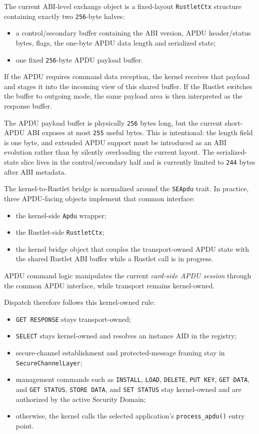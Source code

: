 The current ABI-level exchange object is a fixed-layout
\texttt{RustletCtx} structure containing exactly two \texttt{256}-byte halves:
\begin{itemize}
\item a control/secondary buffer containing the ABI version, APDU
  header/status bytes, flags, the one-byte APDU data length and serialized
  state;
\item one fixed \texttt{256}-byte APDU payload buffer.
\end{itemize}

If the APDU requires command data reception, the kernel receives that
payload and stages it into the incoming view of this shared buffer. If
the Rustlet switches the buffer to outgoing mode, the same payload area
is then interpreted as the response buffer.

The APDU payload buffer is physically \texttt{256} bytes long, but the current
short-APDU ABI exposes at most \texttt{255} useful bytes. This is intentional:
the length field is one byte, and extended APDU support must be introduced as
an ABI evolution rather than by silently overloading the current layout. The
serialized-state slice lives in the control/secondary half and is currently
limited to \texttt{244} bytes after ABI metadata.

The kernel-to-Rustlet bridge is normalized around the
\texttt{SEApdu} trait. In practice, three APDU-facing objects implement
that common interface:
\begin{itemize}
\item the kernel-side \texttt{Apdu} wrapper;
\item the Rustlet-side \texttt{RustletCtx};
\item the kernel bridge object that couples the transport-owned APDU
  state with the shared Rustlet ABI buffer while a Rustlet call is in
  progress.
\end{itemize}

APDU command logic manipulates the current \emph{card-side APDU
session} through the common APDU interface, while transport remains
kernel-owned.

Dispatch therefore follows this kernel-owned rule:
\begin{itemize}
\item \texttt{GET RESPONSE} stays transport-owned;
\item \texttt{SELECT} stays kernel-owned and resolves an instance AID in
  the registry;
\item secure-channel establishment and protected-message framing stay in
  \texttt{SecureChannelLayer};
\item management commands such as \texttt{INSTALL}, \texttt{LOAD},
  \texttt{DELETE}, \texttt{PUT KEY}, \texttt{GET DATA}, and
  \texttt{GET STATUS}, \texttt{STORE DATA}, and \texttt{SET STATUS} stay
  kernel-owned and are authorized by the active Security Domain;
\item otherwise, the kernel calls the selected application's
  \texttt{process\_apdu()} entry point.
\end{itemize}

